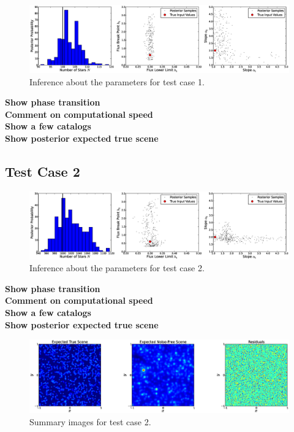 \documentclass[manuscript]{aastex}
\begin{document}
\begin{figure}
\begin{center}
\includegraphics[scale=0.33]{Figures/inference1.eps}
\end{center}
\caption{Inference about the parameters for test case 1.\label{fig:results1}}
\end{figure}

{\bf Show phase transition}\\
{\bf Comment on computational speed}\\
{\bf Show a few catalogs}\\
{\bf Show posterior expected true scene}\\

\subsection{Test Case 2}

\begin{figure}
\begin{center}
\includegraphics[scale=0.33]{Figures/inference2.eps}
\end{center}
\caption{Inference about the parameters for test case 2.\label{fig:results2}}
\end{figure}



{\bf Show phase transition}\\
{\bf Comment on computational speed}\\
{\bf Show a few catalogs}\\
{\bf Show posterior expected true scene}\\

\begin{figure}
\begin{center}
\includegraphics[scale=0.33]{Figures/summaries.eps}
\end{center}
\caption{Summary images for test case 2.\label{fig:summaries}}
\end{figure}
\end{document}
